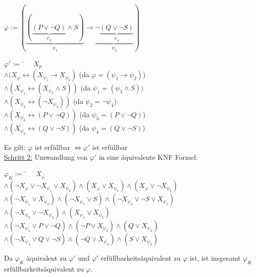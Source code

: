 \documentclass[a4paper,10pt]{article}
\begin{document}
	$ \varphi := (\underbrace{(\underbrace{(P\vee \lnot Q)}_{\psi_3}\wedge S)}_{\psi_1} \rightarrow \underbrace{\lnot \underbrace{(Q \vee \lnot S)}_{\psi_4}}_{\psi_2}) $ \\
	\begin{tabbing}
		$ \varphi' :=$ 
		\= $ \quad X_p $ \qquad \qquad \qquad \qquad \qquad \qquad \qquad \= \\
		\> $ \wedge (X_\varphi \leftrightarrow (X_{\psi_1}\rightarrow X_{\psi_2})$ \> (da $ \varphi = (\psi_1 \rightarrow \psi_2) $) \\
		\> $ \wedge (X_{\psi_1} \leftrightarrow (X_{\psi_3} \wedge S)) $ \> (da $ \psi_1 = (\psi_3 \wedge S)) $ \\
		\> $ \wedge (X_{\psi_2} \leftrightarrow (\lnot X_{\psi_4})) $ \> (da $ \psi_2 = \lnot \psi_4 $) \\
		\> $ \wedge (X_{\psi_3} \leftrightarrow (P \vee \lnot Q)) $ \> (da $ \psi_3 = (P \vee \lnot Q) $) \\
		\> $ \wedge (X_{\psi_4} \leftrightarrow (Q \vee \lnot S)) $ \> (da $ \psi_4 = (Q \vee \lnot S) $)
	\end{tabbing}
	Es gilt: $ \varphi $ ist erfüllbar $ \Longleftrightarrow  \varphi' $ ist erfüllbar \\
	\newpage
	\underline{Schritt 2:} Umwandlung von $ \varphi' $ in eine äquivalente KNF Formel: \\
	\begin{tabbing}
		$ \varphi_K := $
		\= $ \quad X_\varphi $ \\
		\> $ \wedge (\lnot X_\varphi \vee \lnot X_{\psi_1} \vee X_{\psi_2}) \wedge (X_\varphi \vee X_{\psi_1}) \wedge (X_\varphi \vee \lnot X_{\psi_2}) $ \\
		\> $ \wedge (\lnot X_{\psi_1} \vee X_{\psi_3}) \wedge (\lnot X_{\psi_1} \vee S) \wedge (\lnot X_{\psi_3} \vee \lnot S \vee X_{\psi_1}) $ \\
		\> $ \wedge (\lnot X_{\psi_2} \vee \lnot X_{\psi_4}) \wedge (X_{\psi_4} \vee X_{\psi_2}) $ \\
		\> $ \wedge (\lnot X_{\psi_3} \vee P \vee \lnot Q) \wedge (\lnot P \vee X_{\psi_3}) \wedge (Q \vee X_{\psi_3}) $ \\
		\> $ \wedge (\lnot X_{\psi_4} \vee Q \vee \lnot S) \wedge (\lnot Q \vee X_{\psi_4}) \wedge (S \vee X_{\psi_4}) $
	\end{tabbing}
	Da $ \varphi_K $ äquivalent zu $ \varphi' $ und $ \varphi' $ erfüllbarkeitsäquivalent zu $ \varphi $ ist, ist insgesamt $ \varphi_K $\\
	erfüllbarkeitsäquivalent zu $ \varphi $.\\ \\
	
\end{document}
